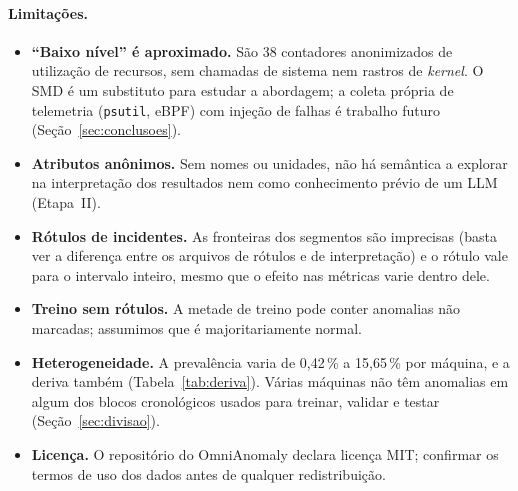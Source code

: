\paragraph{Limitações.}
\begin{itemize}
  \item \textbf{``Baixo nível'' é aproximado.} São 38 contadores anonimizados de utilização de recursos, sem
        chamadas de sistema nem rastros de \emph{kernel}. O SMD é um substituto para estudar a abordagem; a
        coleta própria de telemetria (\texttt{psutil}, eBPF) com injeção de falhas é trabalho
        futuro (Seção~\ref{sec:conclusoes}).
  \item \textbf{Atributos anônimos.} Sem nomes ou unidades, não há semântica a explorar na interpretação dos
        resultados nem como conhecimento prévio de um LLM (Etapa~II).
  \item \textbf{Rótulos de incidentes.} As fronteiras dos segmentos são imprecisas (basta ver a diferença entre
        os arquivos de rótulos e de interpretação) e o rótulo vale para o intervalo inteiro, mesmo que o
        efeito nas métricas varie dentro dele.
  \item \textbf{Treino sem rótulos.} A metade de treino pode conter anomalias não marcadas; assumimos que é
        majoritariamente normal.
  \item \textbf{Heterogeneidade.} A prevalência varia de 0,42\,\% a 15,65\,\% por máquina, e a deriva também
        (Tabela~\ref{tab:deriva}). Várias máquinas não têm anomalias em algum dos blocos cronológicos usados
        para treinar, validar e testar (Seção~\ref{sec:divisao}).
  \item \textbf{Licença.} O repositório do OmniAnomaly declara licença MIT; confirmar os termos de uso dos
        dados antes de qualquer redistribuição.
\end{itemize}
